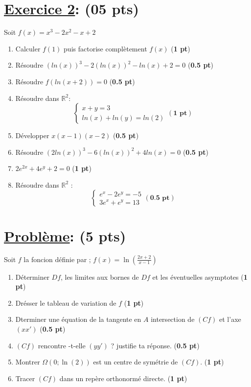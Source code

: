 \documentclass[12pt,a4paper]{article}
\begin{document}
\section*{\underline{Exercice 2}: (05 pts)}
Soit $f(x) = x^{3} -2x^{2}-x+2 $
\begin{enumerate}

\item Calculer $f(1)$ puis factorise complètement $f(x)$  (\textbf{1 pt})
\item Résoudre $(ln(x))^{3}-2(ln(x))^{2} -ln(x)+2 =0$   (\textbf{0.5 pt})
\item {Résoudre $ f(ln(x+2))= 0 $ }   (\textbf{0.5 pt})
\item Résoudre dans $\mathbb{R}^{2}$:
\[
\begin{cases}
x+y=3\\
ln(x)+ln(y)=ln(2)
\end{cases}  (\textbf{1 pt})
\] 

\item Développer $x(x-1)(x-2)$   (\textbf{0.5 pt})
\item Résoudre $(2ln(x))^{3}-6(ln(x))^{2} +4ln(x)=0$   (\textbf{0.5 pt})
\item $2e^{2x}+4e^{y}+2=0$    (\textbf{1 pt})
\item Résoudre dans $\mathbb{R}^{2}$ : 
\[
\begin{cases}
e^{x}-2e^{y}=-5\\
3e^{x}+e^{y}=13 
\end{cases}  (\textbf{0.5 pt})
\]

\end{enumerate}


\section*{\underline{Problème}: (5 pts)}
Soit $f$ la foncion définie par ; $f(x)= \ln\left(\frac{2x+2}{x-1}\right)$
\begin{enumerate}
\item Déterminer $Df$, les limites aux bornes de $Df$ et les éventuelles asymptotes (\textbf{1 pt})
\item Drésser le tableau de variation de $f$   (\textbf{1 pt})
\item Dterminer une équation de la tangente en $A$ intersection de $(Cf)$ et l'axe $(xx')$  (\textbf{0.5 pt})
\item $(Cf)$ rencontre -t-elle $(yy')$ ? justifie ta réponse.     (\textbf{0.5 pt})
\item Montrer  $\Omega(0;\ln(2))$ est un centre de symétrie de $(Cf)$.   (\textbf{1 pt})
\item Tracer $(Cf)$ dans un repère orthonormé directe.    (\textbf{1 pt})
\end{enumerate}
\end{document}
